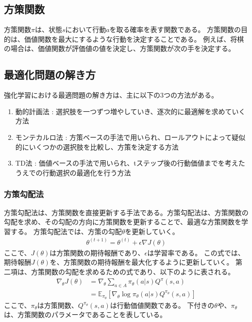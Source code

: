 \documentclass{ltjsarticle}
\begin{document}
\subsection{方策関数}
方策関数$\pi$は、状態$s$において行動$a$を取る確率を表す関数である。
方策関数の目的は、価値関数を最大にするような行動を決定することである。
例えば、将棋の場合は、価値関数が評価値の値を決定し、方策関数が次の手を決定する。

\subsection{最適化問題の解き方}
強化学習における最適問題の解き方は、主に以下の3つの方法がある。
\begin{enumerate}
  \item 動的計画法 :  選択肢を一つずつ増やしていき、逐次的に最適解を求めていく方法
  \item モンテカルロ法 : 方策ベースの手法で用いられ、ロールアウトによって疑似的にいくつかの選択肢を比較し、方策を決定する方法
  \item TD法 : 価値ベースの手法で用いられ、tステップ後の行動価値までを考えたうえでの行動選択の最適化を行う方法
\end{enumerate}

\subsubsection{方策勾配法}
方策勾配法は、方策関数を直接更新する手法である。方策勾配法は、方策関数の勾配を求め、その勾配の方向に方策関数を更新することで、最適な方策関数を学習する。
方策勾配法では、方策の勾配$\theta$を更新していく。
\begin{align}
  \theta^{(t+1)} = \theta^{(t)} + \epsilon \nabla J(\theta)
\end{align}
ここで、$J(\theta)$は方策関数の期待報酬であり、$\epsilon$は学習率である。
この式では、期待報酬$J(\theta)$を、方策関数の期待報酬を最大化するように更新していく。
第二項は、方策関数の勾配を求めるための式であり、以下のように表される。
\begin{align}
  \nabla_{\theta} J(\theta) &= \nabla_{\theta} \sum_{a\in A} \pi_{\theta}(a | s) Q^{\pi}(s, a) \\
  &= \mathbb{E}_{\pi_{\theta}}[\nabla_{\theta} \log \pi_{\theta}(a | s)Q^{\pi_{\theta}}(s, a)]
\end{align}
ここで、$\pi_{\theta}$は方策関数、$Q^{\pi_{\theta}}(s, a)$は行動価値関数である。
下付きの$\theta$や、$\pi_{\theta}$は、方策関数のパラメータであることを表している。
\end{document}
